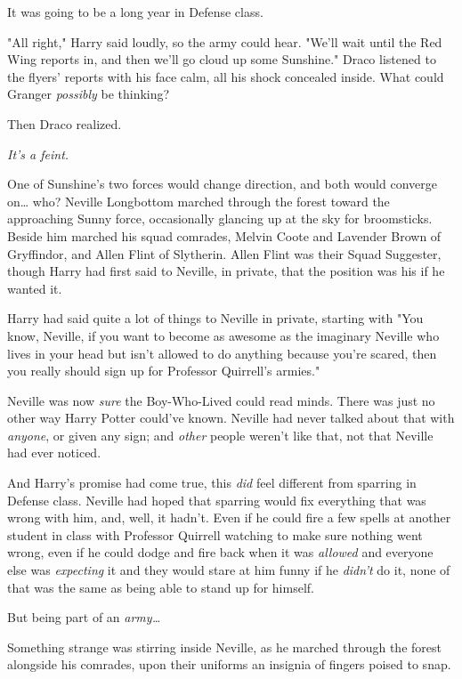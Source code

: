 It was going to be a long year in Defense class.

"All right," Harry said loudly, so the army could hear. "We'll wait until the Red Wing reports in, and then we'll go cloud up some Sunshine."
\sbreak
Draco listened to the flyers' reports with his face calm, all his shock concealed inside. What could Granger \emph{possibly} be thinking?

Then Draco realized.

\emph{It's a feint.}

One of Sunshine's two forces would change direction, and both would converge on{\ldots} who?
\sbreak
Neville Longbottom marched through the forest toward the approaching Sunny force, occasionally glancing up at the sky for broomsticks. Beside him marched his squad comrades, Melvin Coote and Lavender Brown of Gryffindor, and Allen Flint of Slytherin. Allen Flint was their Squad Suggester, though Harry had first said to Neville, in private, that the position was his if he wanted it.

Harry had said quite a lot of things to Neville in private, starting with "You know, Neville, if you want to become as awesome as the imaginary Neville who lives in your head but isn't allowed to do anything because you're scared, then you really should sign up for Professor Quirrell's armies."

Neville was now \emph{sure} the Boy-Who-Lived could read minds. There was just no other way Harry Potter could've known. Neville had never talked about that with \emph{anyone}, or given any sign; and \emph{other} people weren't like that, not that Neville had ever noticed.

And Harry's promise had come true, this \emph{did} feel different from sparring in Defense class. Neville had hoped that sparring would fix everything that was wrong with him, and, well, it hadn't. Even if he could fire a few spells at another student in class with Professor Quirrell watching to make sure nothing went wrong, even if he could dodge and fire back when it was \emph{allowed} and everyone else was \emph{expecting} it and they would stare at him funny if he \emph{didn't} do it, none of that was the same as being able to stand up for himself.

But being part of an \emph{army{\ldots}}

Something strange was stirring inside Neville, as he marched through the forest alongside his comrades, upon their uniforms an insignia of fingers poised to snap.

